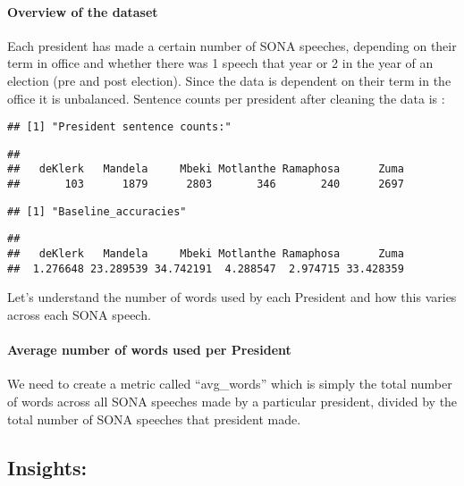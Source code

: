 \documentclass[]{article}
\let\oldparagraph\paragraph
\renewcommand{\paragraph}[1]{\oldparagraph{#1}\mbox{}}
\begin{document}
\hypertarget{overview-of-the-dataset}{%
\paragraph{\texorpdfstring{\textbf{Overview of the
dataset}}{Overview of the dataset}}\label{overview-of-the-dataset}}

Each president has made a certain number of SONA speeches, depending on
their term in office and whether there was 1 speech that year or 2 in
the year of an election (pre and post election). Since the data is
dependent on their term in the office it is unbalanced. Sentence counts
per president after cleaning the data is :

\begin{verbatim}
## [1] "President sentence counts:"
\end{verbatim}

\begin{verbatim}
## 
##   deKlerk   Mandela     Mbeki Motlanthe Ramaphosa      Zuma 
##       103      1879      2803       346       240      2697
\end{verbatim}

\begin{verbatim}
## [1] "Baseline_accuracies"
\end{verbatim}

\begin{verbatim}
## 
##   deKlerk   Mandela     Mbeki Motlanthe Ramaphosa      Zuma 
##  1.276648 23.289539 34.742191  4.288547  2.974715 33.428359
\end{verbatim}

Let's understand the number of words used by each President and how this
varies across each SONA speech.

\hypertarget{average-number-of-words-used-per-president}{%
\paragraph{\texorpdfstring{\textbf{Average number of words used per
President}}{Average number of words used per President}}\label{average-number-of-words-used-per-president}}

We need to create a metric called ``avg\_words'' which is simply the
total number of words across all SONA speeches made by a particular
president, divided by the total number of SONA speeches that president
made.

\hypertarget{insights}{%
\subsection{\texorpdfstring{\textbf{Insights:}}{Insights:}}\label{insights}}
\end{document}
